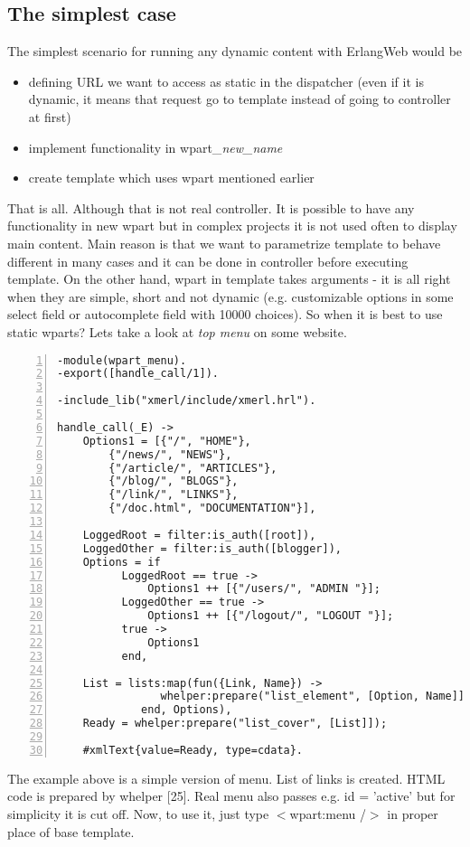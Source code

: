 \subsection{The simplest case}
The simplest scenario for running any dynamic content with ErlangWeb would be 
\begin{itemize}
  \item defining URL we want to access as static in the dispatcher (even if it is
    dynamic, it means that request go to template instead of going to controller at first)
  \item implement functionality in wpart\_\textit{new\_name}
  \item create template which uses wpart mentioned earlier
\end{itemize}
That is all. Although that is not real controller. It is possible to have any functionality in new wpart but in
complex projects it is not used often to display main content. Main reason is
that we want to parametrize template to behave different in many cases and it can be done in
controller before executing template. On the other hand, wpart in template
takes arguments - it is all right when they are simple, short and not dynamic
(e.g. customizable options in some select field or autocomplete field with
10000 choices). So when it is best to use static wparts? Lets take a look at \textit{top menu} on some website.
\begin{Verbatim}[numbers=left, fontsize=\small]
-module(wpart_menu).
-export([handle_call/1]).

-include_lib("xmerl/include/xmerl.hrl").

handle_call(_E) ->
    Options1 = [{"/", "HOME"},
		{"/news/", "NEWS"},
		{"/article/", "ARTICLES"},
		{"/blog/", "BLOGS"},
		{"/link/", "LINKS"},
		{"/doc.html", "DOCUMENTATION"}],
    
    LoggedRoot = filter:is_auth([root]),
    LoggedOther = filter:is_auth([blogger]),
    Options = if
		  LoggedRoot == true ->
		      Options1 ++ [{"/users/", "ADMIN "}];
		  LoggedOther == true ->
		      Options1 ++ [{"/logout/", "LOGOUT "}];
		  true ->
		      Options1
	      end,

    List = lists:map(fun({Link, Name}) ->
			    whelper:prepare("list_element", [Option, Name]]);
		     end, Options),
    Ready = whelper:prepare("list_cover", [List]]);			

    #xmlText{value=Ready, type=cdata}.
\end{Verbatim}
The example above is a simple version of menu. List of links is created. HTML code
is prepared by whelper [25]. Real menu also passes e.g. id = 'active' but for
simplicity it is cut off. Now, to use it, just type $<$wpart:menu /$>$ 
in proper place of base template.
